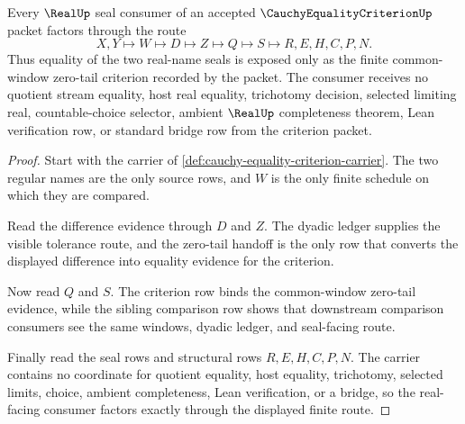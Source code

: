 \begin{theorem}
\label{thm:cauchy-equality-criterion-real-seal-factorization}
Every $\RealUp$ seal consumer of an accepted $\CauchyEqualityCriterionUp$ packet factors through the route
$$
X,Y \longmapsto W \longmapsto D \longmapsto Z \longmapsto Q \longmapsto S \longmapsto R,E,H,C,P,N .
$$
Thus equality of the two real-name seals is exposed only as the finite common-window zero-tail criterion recorded by the packet. The consumer receives no quotient stream equality, host real equality, trichotomy decision, selected limiting real, countable-choice selector, ambient $\RealUp$ completeness theorem, Lean verification row, or standard bridge row from the criterion packet.
\end{theorem}
\begin{proof}
Start with the carrier of \autoref{def:cauchy-equality-criterion-carrier}. The two regular names are the only source rows, and $W$ is the only finite schedule on which they are compared.

Read the difference evidence through $D$ and $Z$. The dyadic ledger supplies the visible tolerance route, and the zero-tail handoff is the only row that converts the displayed difference into equality evidence for the criterion.

Now read $Q$ and $S$. The criterion row binds the common-window zero-tail evidence, while the sibling comparison row shows that downstream comparison consumers see the same windows, dyadic ledger, and seal-facing route.

Finally read the seal rows and structural rows $R,E,H,C,P,N$. The carrier contains no coordinate for quotient equality, host equality, trichotomy, selected limits, choice, ambient completeness, Lean verification, or a bridge, so the real-facing consumer factors exactly through the displayed finite route.
\end{proof}



